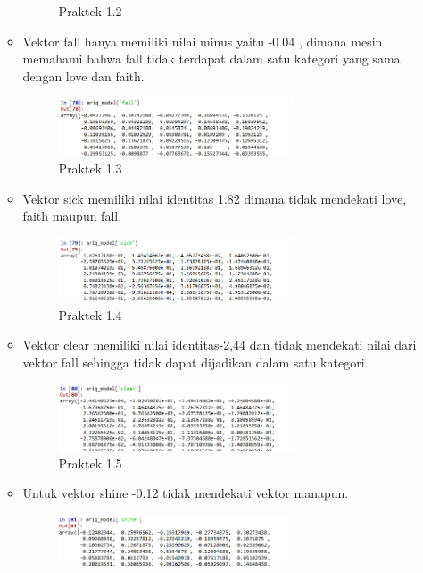 \begin{enumerate}
\begin{itemize}
\begin{figure}[H]
			\centering
			\caption{Praktek 1.2}
		\end{figure}
		\item Vektor fall hanya memiliki nilai minus yaitu -0.04 , dimana mesin memahami bahwa fall tidak terdapat dalam satu kategori yang sama dengan love dan faith.
		\hfill\break
		
		\begin{figure}[H]
			\includegraphics[width=7cm]{figures/1174087/5/10.png}
			\centering
			\caption{Praktek 1.3}
		\end{figure}
		\item Vektor sick memiliki nilai identitas 1.82 dimana tidak mendekati love, faith maupun fall.
		\hfill\break
		
		\begin{figure}[H]
			\includegraphics[width=7cm]{figures/1174087/5/11.png}
			\centering
			\caption{Praktek 1.4}
		\end{figure}
		\item Vektor clear memiliki nilai identitas-2,44 dan tidak mendekati nilai dari vektor fall sehingga tidak dapat dijadikan dalam satu kategori.
		\hfill\break
		
		\begin{figure}[H]
			\includegraphics[width=7cm]{figures/1174087/5/12.png}
			\centering
			\caption{Praktek 1.5}
		\end{figure}
		\item Untuk vektor shine -0.12 tidak mendekati vektor manapun. 
		\hfill\break
		
		\begin{figure}[H]
			\includegraphics[width=7cm]{figures/1174087/5/13.png}

\end{figure}
\end{itemize}
\end{enumerate}
